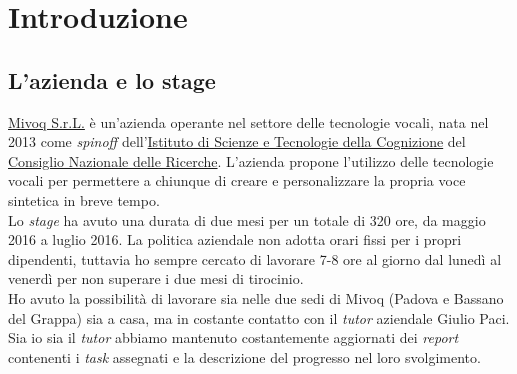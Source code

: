 
\chapter{Introduzione}
\label{cap:introduzione}





\section{L'azienda e lo stage}

\href{https://www.mivoq.it/}{Mivoq S.r.L.} è un'azienda operante nel settore delle tecnologie vocali, nata nel 2013 come
\textit{spinoff} dell'\href{http://www.istc.cnr.it/it}{Istituto di Scienze e Tecnologie della Cognizione} del 
\href{https://www.cnr.it/}{Consiglio Nazionale delle Ricerche}. L'azienda propone l'utilizzo delle tecnologie vocali per permettere a chiunque di creare e personalizzare la propria voce sintetica in breve tempo. \\

Lo \textit{stage} ha avuto una durata di due mesi per un totale di 320 ore, da maggio 2016 a luglio 2016.
La politica aziendale non adotta orari fissi per i propri dipendenti, tuttavia ho sempre cercato di lavorare
7-8 ore al giorno dal lunedì al venerdì per non superare i due mesi di tirocinio. \\ Ho avuto la possibilità di
lavorare  sia nelle due sedi di Mivoq (Padova e Bassano del Grappa) sia a casa, ma in costante contatto
con il \textit{tutor} aziendale Giulio Paci. \\ Sia io sia il \textit{tutor} abbiamo mantenuto costantemente aggiornati dei \textit{report}
contenenti i \textit{task} assegnati e la descrizione del progresso nel loro svolgimento. 

